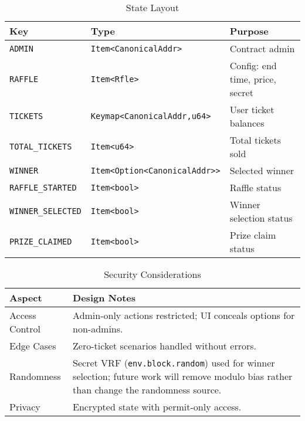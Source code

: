 \documentclass[8pt]{extarticle}
\begin{document}

\begin{table}[h]
  \centering
  \vspace{0cm}
  \hspace{0cm}
  \caption{State Layout}
  \label{tab:State Layout}
  \begin{tabular}{@{}lll@{}}
    \toprule
    \textbf{Key} & \textbf{Type} & \textbf{Purpose} \\
    \midrule
    \texttt{ADMIN} & \texttt{Item<CanonicalAddr>} & Contract admin \\
    \texttt{RAFFLE} & \texttt{Item<Rfle>} & Config: end time, price, secret \\
    \texttt{TICKETS} & \texttt{Keymap<CanonicalAddr,u64>} & User ticket balances \\
    \texttt{TOTAL\_TICKETS} & \texttt{Item<u64>} & Total tickets sold \\
    \texttt{WINNER} & \texttt{Item<Option<CanonicalAddr>>} & Selected winner \\
    \texttt{RAFFLE\_STARTED} & \texttt{Item<bool>} & Raffle status \\
    \texttt{WINNER\_SELECTED} & \texttt{Item<bool>} & Winner selection status \\
    \texttt{PRIZE\_CLAIMED} & \texttt{Item<bool>} & Prize claim status \\
    \bottomrule
\end{tabular}
\end{table}

\begin{table}[h]
  \centering
  \vspace{0cm}
  \hspace{0cm}
  \caption{Security Considerations}
  \label{tab:Security Considerations}
  \begin{tabular}{@{}lp{10cm}@{}}
    \toprule
    \textbf{Aspect} & \textbf{Design Notes} \\
    \midrule
    Access Control & Admin-only actions restricted; UI conceals options for non-admins. \\
    \midrule
    Edge Cases & Zero-ticket scenarios handled without errors. \\
    \midrule
    Randomness & Secret VRF (\texttt{env.block.random}) used for winner selection; future work will remove modulo bias rather than change the randomness source. \\
    \midrule
    Privacy & Encrypted state with permit-only access. \\
    \bottomrule
  \end{tabular}
\end{table}
\end{document}
